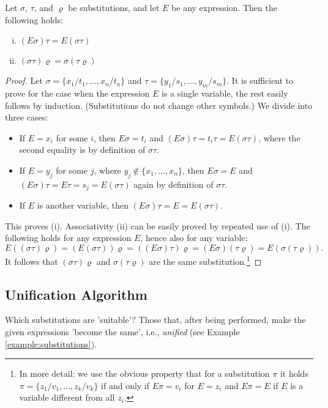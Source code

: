 \begin{proposition}
Let $\sigma$, $\tau$, and $\varrho$ be substitutions, and let $E$ be any expression. Then the following holds:
\begin{enumerate}[(i)]
    \item $(E\sigma)\tau=E(\sigma\tau)$
    \item $(\sigma\tau)\varrho=\sigma(\tau\varrho)$
\end{enumerate}
\end{proposition}

\begin{proof}
Let $\sigma=\{x_1/t_1,\dots,x_n/t_n\}$ and $\tau=\{y_1/s_1,\dots,y_m/s_m\}$. It is sufficient to prove for the case when the expression $E$ is a single variable, the rest easily follows by induction. (Substitutions do not change other symbols.) We divide into three cases:
\begin{itemize}
    \item If $E=x_i$ for some $i$, then $E\sigma=t_i$ and $(E\sigma)\tau=t_i\tau=E(\sigma\tau)$, where the second equality is by definition of $\sigma\tau$.
    \item If $E=y_j$ for some $j$, where $y_j\notin\{x_1,\dots,x_n\}$, then $E\sigma=E$ and $(E\sigma)\tau=E\tau=s_j=E(\sigma\tau)$ again by definition of $\sigma\tau$.
    \item If $E$ is another variable, then $(E\sigma)\tau=E=E(\sigma\tau)$.
\end{itemize}
This proves (i). Associativity (ii) can be easily proved by repeated use of (i). The following holds for any expression $E$, hence also for any variable:
$$
E((\sigma\tau)\varrho)=(E(\sigma\tau))\varrho=((E\sigma)\tau)\varrho=(E\sigma)(\tau\varrho)=E(\sigma(\tau\varrho)).
$$
It follows that $(\sigma\tau)\varrho$ and $\sigma(\tau\varrho)$ are the same substitution.\footnote{In more detail: we use the obvious property that for a substitution $\pi$ it holds $\pi=\{z_1/v_1,\dots,z_k/v_k\}$ if and only if $E\pi=v_i$ for $E=z_i$ and $E\pi=E$ if $E$ is a variable different from all $z_i$.}
\end{proof}    

\subsection{Unification Algorithm}

Which substitutions are 'suitable'? Those that, after being performed, make the given expressions 'become the same', i.e., \emph{unified} (see Example \ref{example:substitutions}).

